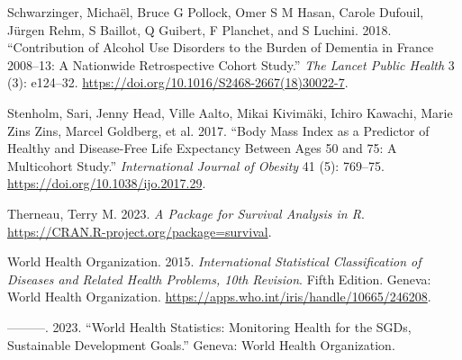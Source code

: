 \documentclass{article}
\newlength{\cslhangindent}
\newlength{\cslentryspacingunit} %
\newenvironment{CSLReferences}[2] %
 {%
  \setlength{\parindent}{0pt}
  \ifodd #1
  \let\oldpar\par
  \def\par{\hangindent=\cslhangindent\oldpar}
  \fi
  \setlength{\parskip}{#2\cslentryspacingunit}
 }%
 {}
\begin{document}
\begin{CSLReferences}{1}{0}
\leavevmode{}%
Schwarzinger, Michaël, Bruce G Pollock, Omer S M Hasan, Carole Dufouil,
Jürgen Rehm, S Baillot, Q Guibert, F Planchet, and S Luchini. 2018.
{``Contribution of Alcohol Use Disorders to the Burden of Dementia in
{France} 2008--13: A Nationwide Retrospective Cohort Study.''} \emph{The
Lancet Public Health} 3 (3): e124--32.
\url{https://doi.org/10.1016/S2468-2667(18)30022-7}.

\leavevmode{}%
Stenholm, Sari, Jenny Head, Ville Aalto, Mikai Kivimäki, Ichiro Kawachi,
Marie Zins Zins, Marcel Goldberg, et al. 2017. {``Body Mass Index as a
Predictor of Healthy and Disease-Free Life Expectancy Between Ages 50
and 75: A Multicohort Study.''} \emph{International Journal of Obesity}
41 (5): 769--75. \url{https://doi.org/10.1038/ijo.2017.29}.

\leavevmode{}%
Therneau, Terry M. 2023. \emph{A {Package} for {Survival} {Analysis} in
{R}}. \url{https://CRAN.R-project.org/package=survival}.

\leavevmode{}%
World Health Organization. 2015. \emph{International Statistical
Classification of Diseases and Related Health Problems, 10th Revision}.
Fifth Edition. Geneva: World Health Organization.
\url{https://apps.who.int/iris/handle/10665/246208}.

\leavevmode{}%
---------. 2023. {``World Health Statistics: {Monitoring} Health for the
{SGDs}, Sustainable Development Goals.''} Geneva: World Health
Organization.

\end{CSLReferences}



\end{document}
